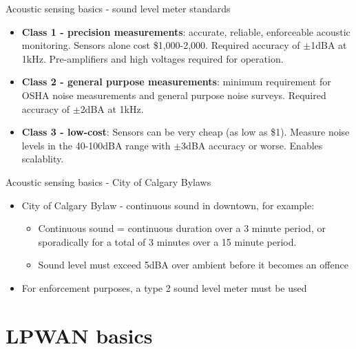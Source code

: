 \documentclass{beamer}
\begin{document}
    \begin{frame}{Acoustic sensing basics - sound level meter standards}
        \begin{itemize}
            \item {\bf Class 1 - precision measurements}: accurate, reliable, enforceable acoustic monitoring. Sensors alone cost \$1,000-2,000. Required accuracy of $\pm$1dBA at 1kHz. Pre-amplifiers and high voltages required for operation.
            \item {\bf Class 2 - general purpose measurements}: minimum requirement for OSHA noise measurements and general purpose noise surveys. Required accuracy of $\pm$2dBA at 1kHz.
            \item {\bf Class 3 - low-cost}: Sensors can be very cheap (as low as \$1). Measure noise levels in the 40-100dBA range with $\pm$3dBA accuracy or worse. Enables scalablity.
        \end{itemize}
    \end{frame}

    \begin{frame}{Acoustic sensing basics - City of Calgary Bylaws}
        \begin{itemize}
            \item City of Calgary Bylaw - continuous sound in downtown, for example: 
           \begin{center} 
            \end{center}
            \begin{itemize}
                \item Continuous sound = continuous duration over a 3 minute period, or sporadically for a total of 3 minutes over a 15 minute period. 
                \item Sound level must exceed 5dBA over ambient before it becomes an offence
            \end{itemize}
            \item For enforcement purposes, a type 2 sound level meter must be used 
        \end{itemize}
    \end{frame}

\section{LPWAN basics}
\end{document}
